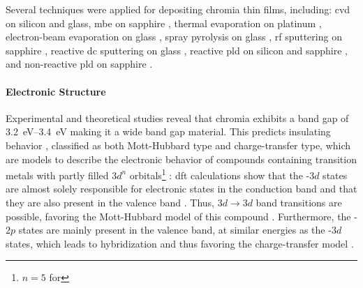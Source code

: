 Several techniques were applied for depositing chromia thin films, including:
\gls{cvd}
    \cite{cheng2000,cheng2001a,cheng2001}
    on silicon and glass,
\gls{mbe} on sapphire
    \cite{farrell2015,kehoe2016},
thermal evaporation on platinum
    \cite{robbert1998},
electron-beam evaporation on glass
    \cite{al-kuhaili2007},
spray pyrolysis on glass
    \cite{arca2011},
\gls{rf} sputtering on sapphire
    \cite{stepanov2021,polyakov2022a,polyakov2022},
reactive \gls{dc} sputtering on glass
    \cite{guillen2021},
reactive \gls{pld} on silicon
    \cite{caricato2010}
and sapphire
    \cite{punugupati2015},
and non-reactive \gls{pld} on sapphire
    \cite{singh2019,arca2017,kehoe2016}.

\paragraph{Electronic Structure}
Experimental and theoretical studies reveal that chromia exhibits a band gap of \qtyrange{3.2}{3.4}{\eV}
    \cite{mi2018,robbert1998,lebreau2014,arca2013}
making it a wide band gap material.
This predicts insulating behavior \cite{arca2013}, classified as both Mott-Hubbard type and charge-transfer type, which are models to describe the electronic behavior of compounds containing transition metals with partly filled $3d^n$ orbitals\footnote{$n=5$ for }
    \cite{catti1996,mi2018,lebreau2014}:
\gls{dft} calculations show that the -$3d$ states are almost solely responsible for electronic states in the conduction band and that they are also present in the valence band
    \cite{mi2018,lebreau2014}.
Thus, $3d\longrightarrow 3d$ band transitions are possible, favoring the Mott-Hubbard model of this compound
    \cite{lebreau2014}.
Furthermore, the -$2p$ states are mainly present in the valence band, at similar energies as the -$3d$ states, which leads to hybridization and thus favoring the charge-transfer model
    \cite{lebreau2014}.

